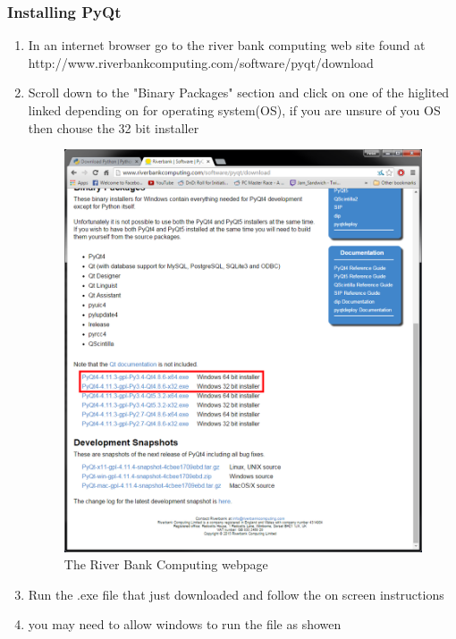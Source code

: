 \subsubsection{Installing PyQt}
\begin{enumerate}
\item In an internet browser go to the river bank computing web site found at http://www.riverbankcomputing.com/software/pyqt/download
\item Scroll down to the "Binary Packages" section and click on one of the higlited linked depending on for operating system(OS), if you are unsure of you OS then chouse the 32 bit installer
\begin{figure}[H]
\includegraphics[width=\textwidth]{./Manual/PyQtInstall/Part1.png}
\caption{The River Bank Computing webpage} \label{fig:PyQtISP1}
\end{figure}
\item Run the .exe file that just downloaded and follow the on screen instructions
\item you may need to allow windows to run the file as showen
\begin{figure}[H]

\end{figure}
\end{enumerate}
